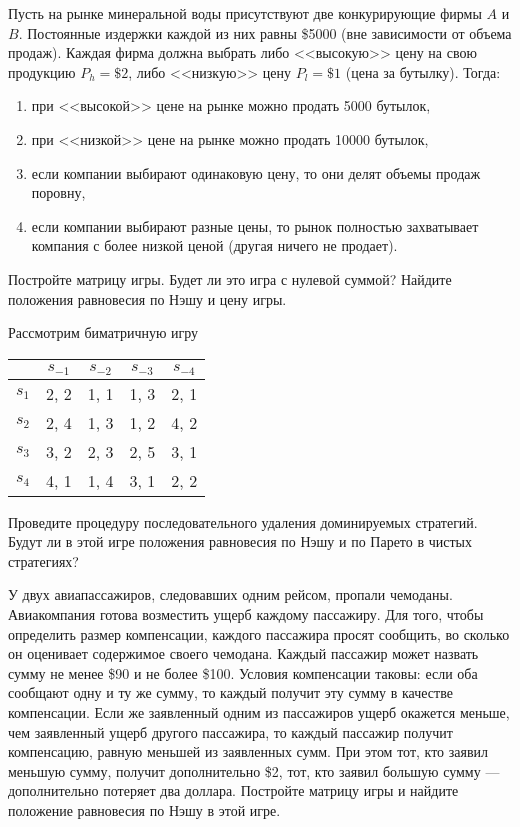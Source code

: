 \begin{exercise}
Пусть на рынке минеральной воды присутствуют две конкурирующие фирмы $A$ и $B$. 
Постоянные издержки каждой из них равны \$5000
(вне зависимости от объема продаж). Каждая фирма
должна выбрать либо <<высокую>> цену на свою продукцию $P_h=\$2$, либо <<низкую>> цену $P_l=\$1$
(цена за бутылку). Тогда:
\begin{enumerate}
	\item при <<высокой>> цене на рынке можно продать 5000 бутылок,
	\item при <<низкой>> цене на рынке можно продать 10000 бутылок,
	\item если компании выбирают одинаковую цену, то они делят объемы продаж поровну,
	\item если компании выбирают разные цены, то рынок полностью захватывает компания
	с более низкой ценой (другая ничего не продает).
\end{enumerate}
Постройте матрицу игры. Будет ли это игра с нулевой суммой? Найдите положения равновесия
по Нэшу и цену игры.
\end{exercise}

\begin{exercise}
Рассмотрим биматричную игру
\begin{center}
	\begin{tabular}{|c||c|c|c|c|}
	 \hline
	& $s_{-1}$ & $s_{-2}$ & $s_{-3}$ & $s_{-4}$\\ \hline \hline
	$s_1$ & 2, 2 & 1, 1 & 1, 3 & 2, 1\\ \hline
	$s_2$ & 2, 4 & 1, 3 & 1, 2 & 4, 2\\ \hline
	$s_3$ & 3, 2 & 2, 3 & 2, 5 & 3, 1 \\ \hline
	$s_4$ & 4, 1 & 1, 4 & 3, 1 & 2, 2 \\
	\hline
	\end{tabular}
\end{center}
Проведите процедуру последовательного удаления доминируемых стратегий.
Будут ли в этой игре положения равновесия по Нэшу и по Парето в чистых стратегиях?
\end{exercise}

\begin{exercise}
У двух авиапассажиров, следовавших одним рейсом, пропали чемоданы. 
Авиакомпания готова возместить ущерб каждому пассажиру. 
Для того, чтобы определить размер компенсации, каждого пассажира просят сообщить, 
во сколько он оценивает содержимое своего чемодана. 
Каждый пассажир может назвать сумму не менее \$90 и не более \$100. 
Условия компенсации таковы: если оба сообщают одну и ту же сумму, 
то каждый получит эту сумму в качестве компенсации. 
Если же заявленный одним из пассажиров ущерб окажется меньше, 
чем заявленный ущерб другого пассажира, то каждый пассажир получит компенсацию, 
равную меньшей из заявленных сумм. При этом тот, кто заявил меньшую сумму,
получит дополнительно \$2, тот, кто заявил большую сумму — дополнительно потеряет два доллара.
Постройте матрицу игры и найдите положение равновесия по Нэшу в этой игре.
\end{exercise}

